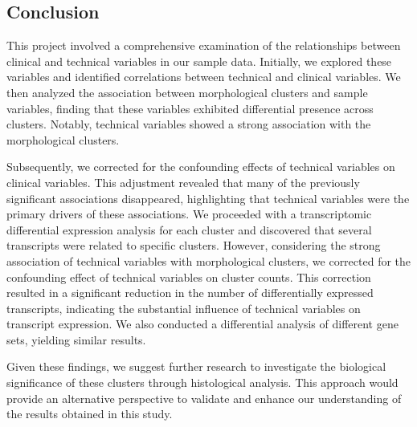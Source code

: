 \documentclass[a4paper, 11pt]{article}
\begin{document}
\begin{multicols}{2}
\section*{Conclusion}

This project involved a comprehensive examination of the relationships between clinical and technical variables in our sample data.
Initially, we explored these variables and identified correlations between technical and clinical variables.
We then analyzed the association between morphological clusters and sample variables, finding that these variables exhibited differential presence across clusters.
Notably, technical variables showed a strong association with the morphological clusters.

Subsequently, we corrected for the confounding effects of technical variables on clinical variables.
This adjustment revealed that many of the previously significant associations disappeared, highlighting that technical variables were the primary drivers of these associations.
We proceeded with a transcriptomic differential expression analysis for each cluster and discovered that several transcripts were related to specific clusters.
However, considering the strong association of technical variables with morphological clusters, we corrected for the confounding effect of technical variables on cluster counts.
This correction resulted in a significant reduction in the number of differentially expressed transcripts, indicating the substantial influence of technical variables on transcript expression.
We also conducted a differential analysis of different gene sets, yielding similar results.

Given these findings, we suggest further research to investigate the biological significance of these clusters through histological analysis.
This approach would provide an alternative perspective to validate and enhance our understanding of the results obtained in this study.




\end{multicols}
\end{document}
